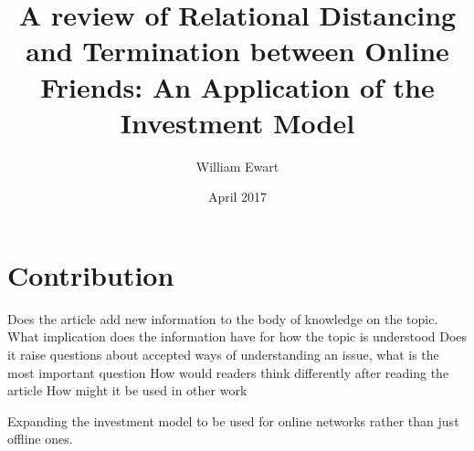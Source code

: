 \documentclass[12pt]{article}
\title{A review of Relational Distancing and Termination between Online Friends: An Application of the Investment Model}
\author{William Ewart}
\date{April 2017}
\begin{document}
\begin{titlingpage}
\maketitle
\tableofcontents
\end{titlingpage}
\newpage
\section{Contribution}
Does the article add new information to the body of knowledge on the topic. What implication does the information have for how the topic is understood
Does it raise questions about accepted ways of understanding an issue, what is the most important question
How would readers think differently after reading the article
How might it be used in other work

Expanding the investment model to be used for online networks rather than just offline ones.
\end{document}

